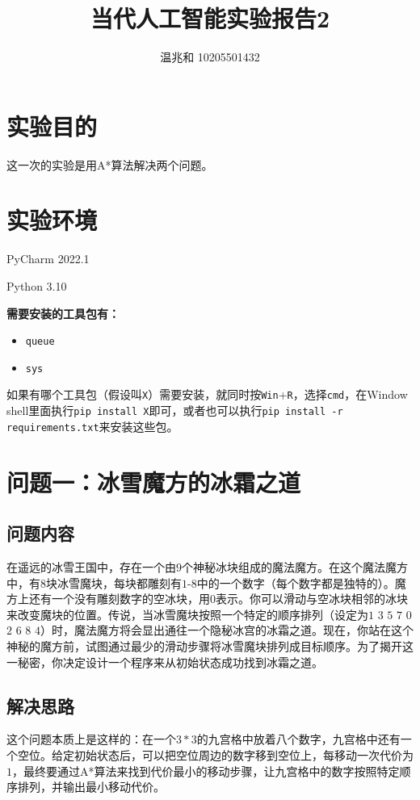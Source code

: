 \documentclass{article}
\title{当代人工智能实验报告2}
\author{温兆和 10205501432}
\begin{document}
\maketitle

\section{实验目的}
这一次的实验是用A*算法解决两个问题。

\section{实验环境}
PyCharm 2022.1

Python 3.10

\textbf{需要安装的工具包有：}
\begin{spacing}{0.5}
\begin{itemize}
\item \lstinline|queue|
\item \lstinline|sys|
\end{itemize}
\end{spacing}
如果有哪个工具包（假设叫\lstinline|X|）需要安装，就同时按\lstinline|Win|+\lstinline|R|，选择\lstinline|cmd|，在Window shell里面执行\lstinline|pip install X|即可，或者也可以执行\lstinline|pip install -r requirements.txt|来安装这些包。

\section{问题一：冰雪魔⽅的冰霜之道}

\subsection{问题内容}
在遥远的冰雪王国中，存在⼀个由$9$个神秘冰块组成的魔法魔⽅。在这个魔法魔⽅中，有$8$块冰雪魔块，每块都雕刻有$1$-$8$中的⼀个数字（每个数字都是独特的）。魔⽅上还有⼀个没有雕刻数字的空冰块，⽤$0$表示。你可以滑动与空冰块相邻的冰块来改变魔块的位置。传说，当冰雪魔块按照⼀个特定的顺序排列（设定为$1$ $3$ $5$ $7$ $0$ $2$ $6$ $8$ $4$）时，魔法魔⽅将会显出通往⼀个隐秘冰宫的冰霜之道。现在，你站在这个神秘的魔⽅前，试图通过最少的滑动步骤将冰雪魔块排列成⽬标顺序。为了揭开这⼀秘密，你决定设计⼀个程序来从初始状态成功找到冰霜之道。


\subsection{解决思路}
这个问题本质上是这样的：在一个$3*3$的九宫格中放着八个数字，九宫格中还有一个空位。给定初始状态后，可以把空位周边的数字移到空位上，每移动一次代价为$1$，最终要通过A*算法来找到代价最小的移动步骤，让九宫格中的数字按照特定顺序排列，并输出最小移动代价。
\end{document}
